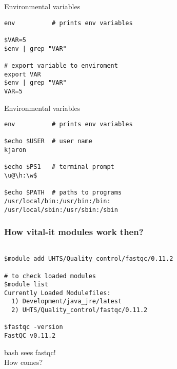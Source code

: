 \documentclass[xcolor=dvipsnames]{beamer}
\begin{document}
\begin{frame}[fragile]
	\begin{center}
		\huge
		Environmental variables \\
	\end{center}

\Large
\begin{Verbatim}
env          # prints env variables

$VAR=5
$env | grep "VAR"

# export variable to enviroment
export VAR
$env | grep "VAR"
VAR=5
\end{Verbatim}
\end{frame}

\begin{frame}[fragile]
	\begin{center}
		\huge
		Environmental variables \\
	\end{center}

\Large
\begin{Verbatim}
env          # prints env variables

$echo $USER  # user name
kjaron

$echo $PS1   # terminal prompt
\u@\h:\w$

$echo $PATH  # paths to programs
/usr/local/bin:/usr/bin:/bin:
/usr/local/sbin:/usr/sbin:/sbin
\end{Verbatim}
\end{frame}

\begin{frame}[fragile]
\frametitle{How vital-it modules work then?}
\large
\begin{verbatim}

$module add UHTS/Quality_control/fastqc/0.11.2

# to check loaded modules
$module list
Currently Loaded Modulefiles:
  1) Development/java_jre/latest
  2) UHTS/Quality_control/fastqc/0.11.2

$fastqc -version
FastQC v0.11.2
\end{verbatim}
\end{frame}

\begin{frame}
	\begin{center}
		\Huge
		bash sees fastqc!\\
		\vspace{1cm}
		\Large
		How comes?
	\end{center}
\end{frame}
\end{document}
